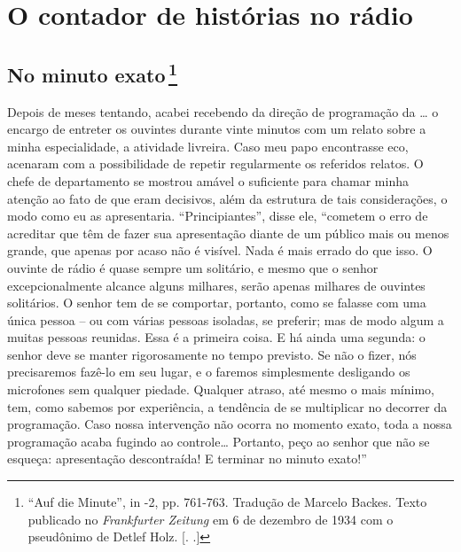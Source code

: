 


\part{O contador de histórias no rádio}

\chapter{No minuto exato\,\footnote[*]{``Auf die Minute'', in  -2, pp. 761-763.
  Tradução de Marcelo Backes. Texto publicado no \emph{Frankfurter
  Zeitung} em 6 de dezembro de 1934 com o pseudônimo de Detlef Holz.
  [. .]} }

Depois de meses tentando, acabei recebendo da direção de programação da
\ldots{} o encargo de entreter os ouvintes durante vinte minutos com um
relato sobre a minha especialidade, a atividade livreira. Caso meu papo
encontrasse eco, acenaram com a possibilidade de repetir regularmente os
referidos relatos. O chefe de departamento se mostrou amável o
suficiente para chamar minha atenção ao fato de que eram decisivos, além
da estrutura de tais considerações, o modo como eu as apresentaria.
``Principiantes'', disse ele, ``cometem o erro de acreditar que têm de
fazer sua apresentação diante de um público mais ou menos grande, que
apenas por acaso não é visível. Nada é mais errado do que isso. O
ouvinte de rádio é quase sempre um solitário, e mesmo que o senhor
excepcionalmente alcance alguns milhares, serão apenas milhares de
ouvintes solitários. O senhor tem de se comportar, portanto, como se
falasse com uma única pessoa -- ou com várias pessoas isoladas, se
preferir; mas de modo algum a muitas pessoas reunidas. Essa é a primeira
coisa. E há ainda uma segunda: o senhor deve se manter rigorosamente no
tempo previsto. Se não o fizer, nós precisaremos fazê-lo em seu lugar, e
o faremos simplesmente desligando os microfones sem qualquer piedade.
Qualquer atraso, até mesmo o mais mínimo, tem, como sabemos por
experiência, a tendência de se multiplicar no decorrer da programação.
Caso nossa intervenção não ocorra no momento exato, toda a nossa
programação acaba fugindo ao controle\ldots{} Portanto, peço ao senhor que
não se esqueça: apresentação descontraída! E terminar no minuto exato!''

